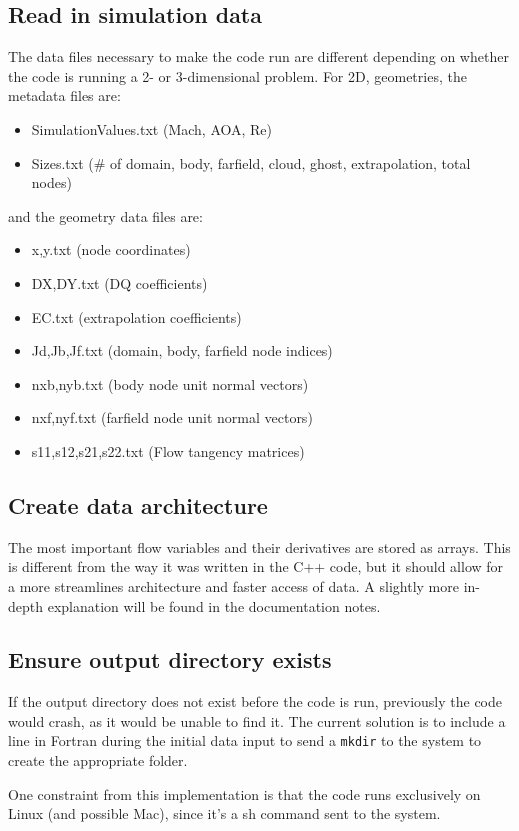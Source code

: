 \documentclass[12pt]{article}
\begin{document}
    \subsection{Read in simulation data}
    The data files necessary to make the code run are different depending on whether the code is running a 2- or 3-dimensional problem. For 2D, geometries, the metadata files are:
    \begin{itemize}
        \item SimulationValues.txt (Mach, AOA, Re)
        \item Sizes.txt (\# of domain, body, farfield, cloud, ghost, extrapolation, total nodes)
    \end{itemize}
    and the geometry data files are:
    \begin{itemize}
        \item x,y.txt (node coordinates)
        \item DX,DY.txt (DQ coefficients)
        \item EC.txt (extrapolation coefficients)
        \item Jd,Jb,Jf.txt (domain, body, farfield node indices)
        \item nxb,nyb.txt (body node unit normal vectors)
        \item nxf,nyf.txt (farfield node unit normal vectors)
        \item s11,s12,s21,s22.txt (Flow tangency matrices)
    \end{itemize}

    \subsection{Create data architecture}
    The most important flow variables and their derivatives are stored as arrays. This is different from the way it was written in the C++ code, but it should allow for a more streamlines architecture and faster access of data. A slightly more in-depth explanation will be found in the documentation notes.

    \subsection{Ensure output directory exists}
    If the output directory does not exist before the code is run, previously the code would crash, as it would be unable to find it. The current solution is to include a line in Fortran during the initial data input to send a \texttt{mkdir} to the system to create the appropriate folder.

    One constraint from this implementation is that the code runs exclusively on Linux (and possible Mac), since it's a sh command sent to the system.
\end{document}
